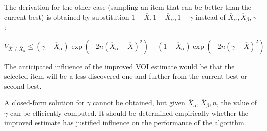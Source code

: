 \documentclass{article}
\begin{document}
The derivation for the other case
(sampling an item that can be better than the current best) is
obtained by substitution $1-\overline X, 1-\overline X_\alpha, 1-\gamma$ instead of
$\overline X_\alpha, \overline X_\beta, \gamma$:

\[ V_{\overline X\ne\overline X_\alpha} \le (\gamma-\overline X_\alpha)\exp\left(-2n(\overline X_\alpha-\overline
  X)^2\right)+(1-\overline X_\alpha)\exp\left(-2n(\gamma-\overline X)^2\right) \]

The anticipated influence of the improved
VOI estimate would be that the selected item will be a less discovered
one and further from the current best or second-best.

A closed-form solution for $\gamma$ cannot be obtained, but given
$\overline X_\alpha, \overline X_\beta, n$, the value of $\gamma$ can be efficiently
computed. It should be determined empirically whether the improved
estimate has justified influence on the performance of the algorithm.



\end{document}
